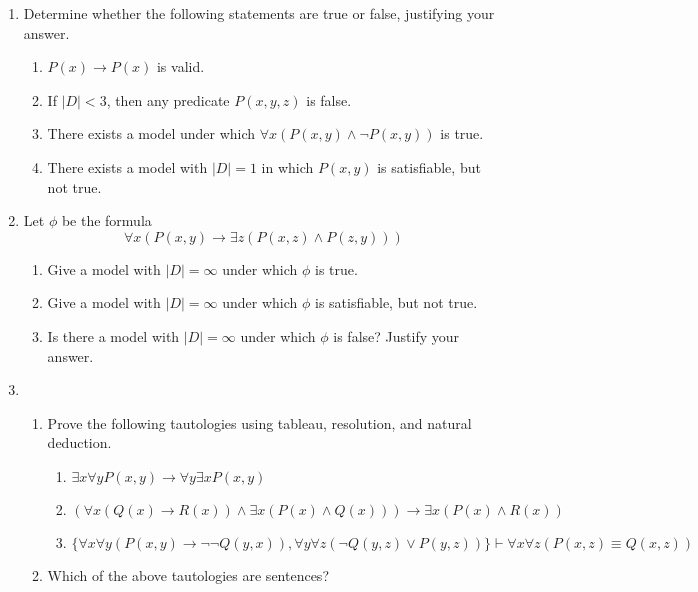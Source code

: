 \documentclass[a4paper, 12pt]{article}
\begin{document}
\begin{enumerate}

\item Determine whether the following statements are true or false, justifying your answer.
\begin{enumerate}
    \item $P(x) \rightarrow P(x)$ is valid.
    \item If $|D| < 3$, then any predicate $P(x, y, z)$ is false.
    \item There exists a model under which $\forall x (P(x, y) \wedge \neg P(x, y))$ is true.
    \item There exists a model with $|D|=1$ in which $P(x, y)$ is satisfiable, but not true.
\end{enumerate}
\item Let $\phi$ be the formula
\begin{equation*}
    \forall x (P(x, y) \rightarrow \exists z (P(x, z) \wedge P(z, y)))
\end{equation*}
\begin{enumerate}
    \item Give a model with $|D| = \infty$ under which $\phi$ is true.
    \item Give a model with $|D| = \infty$ under which $\phi$ is satisfiable, but not true.
    \item Is there a model with $|D| = \infty$ under which $\phi$ is false? Justify your answer.
\end{enumerate}
\item 
\begin{enumerate}
    \item Prove the following tautologies using tableau, resolution, and natural deduction.
    \begin{enumerate}
    \item $\exists x \forall y P(x, y) \rightarrow \forall y \exists x P(x, y)$
    \item $(\forall x(Q(x) \rightarrow R(x)) \wedge \exists x (P(x) \wedge Q(x))) \rightarrow \exists x (P(x) \wedge R(x))$
    \item $\{\forall x \forall y (P(x, y) \rightarrow \neg \neg Q(y, x)), \forall y \forall z (\neg Q(y, z) \vee P(y, z))\} \vdash \forall x \forall z (P(x, z) \equiv Q(x, z)) $
    \end{enumerate}
    \item Which of the above tautologies are sentences?
\end{enumerate}

\end{enumerate}
\end{document}
